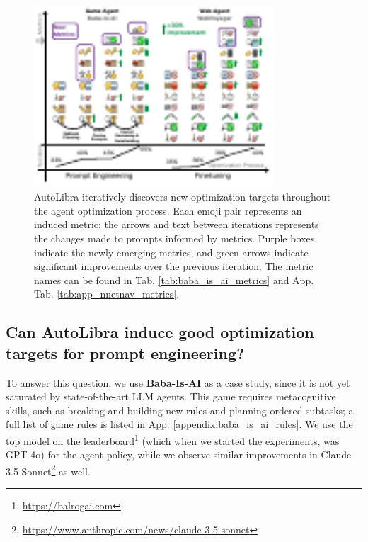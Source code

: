 \begin{figure}[!t]
    \centering
    \includegraphics[width=0.8\textwidth]{figs/autolibra-teaser.pdf}
    \caption{AutoLibra iteratively discovers new optimization targets throughout the agent optimization process. Each emoji pair represents an induced metric; the arrows and text between iterations represents the changes made to prompts informed by metrics. Purple boxes indicate the newly emerging metrics, and green arrows indicate significant improvements over the previous iteration. The metric names can be found in Tab. \ref{tab:baba_is_ai_metrics} and App. Tab. \ref{tab:app_nnetnav_metrics}.
    }
    \label{fig:autolibra-training}
    \vspace{-20pt}
\end{figure}

\subsection{Can AutoLibra induce good optimization targets for prompt engineering?}
\label{sec:Baba-Is-AI}

To answer this question, we use \textbf{Baba-Is-AI} \citep{cloos2024babaaibreakrules, paglieri2024balrog} as a case study, since it is not yet saturated by state-of-the-art LLM agents. This game requires metacognitive skills, such as breaking and building new rules and planning ordered subtasks; a full list of game rules is listed in App. \ref{appendix:baba_is_ai_rules}.
We use the top model on the leaderboard\footnote{\url{https://balrogai.com}} (which when we started the experiments, was GPT-4o) \citep{openai2024gpt4ocard} for the agent policy, while we observe similar improvements in Claude-3.5-Sonnet\footnote{\url{https://www.anthropic.com/news/claude-3-5-sonnet}} as well.

